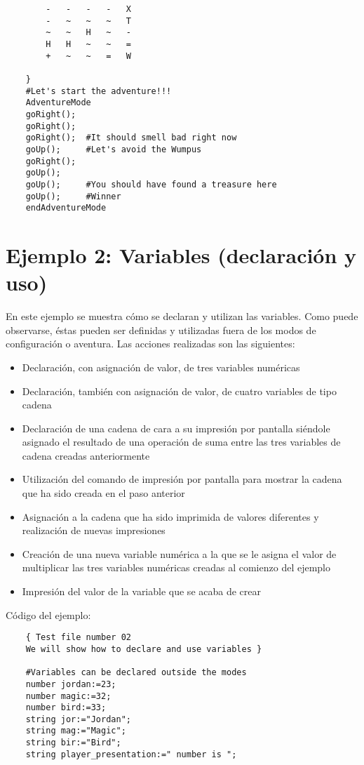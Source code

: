 \documentclass[a4paper,12pt,twoside,openright]{report}
\begin{document}
{\begin{lstlisting}
	    -	-	-	-	X
	    -	~	~	~	T
	    ~	~	H	~	-
	    H	H	~	~	=
	    +	~	~	=	W

    }
    #Let's start the adventure!!!
    AdventureMode
    goRight();
    goRight();
    goRight();	#It should smell bad right now
    goUp();		#Let's avoid the Wumpus
    goRight();
    goUp();
    goUp();		#You should have found a treasure here
    goUp();		#Winner
    endAdventureMode
  \end{lstlisting}

  
  \section{Ejemplo 2: Variables (declaración y uso)}
  En este ejemplo se muestra cómo se declaran y utilizan las variables. Como puede observarse, éstas pueden ser 
  definidas y utilizadas fuera de los modos de configuración o aventura. Las acciones realizadas son las siguientes:
  \begin{itemize}
   \item Declaración, con asignación de valor, de tres variables numéricas
   \item Declaración, también con asignación de valor, de cuatro variables de tipo cadena
   \item Declaración de una cadena de cara a su impresión por pantalla siéndole asignado el resultado de una operación 
   de suma entre las tres variables de cadena creadas anteriormente
   \item Utilización del comando de impresión por pantalla para mostrar la cadena que ha sido creada en el paso anterior
   \item Asignación a la cadena que ha sido imprimida de valores diferentes y realización de nuevas impresiones
   \item Creación de una nueva variable numérica a la que se le asigna el valor de multiplicar las tres variables numéricas 
   creadas al comienzo del ejemplo
   \item Impresión del valor de la variable que se acaba de crear
  \end{itemize}

  Código del ejemplo:
  \begin{lstlisting}
    { Test file number 02
    We will show how to declare and use variables }

    #Variables can be declared outside the modes
    number jordan:=23;
    number magic:=32;
    number bird:=33;
    string jor:="Jordan";
    string mag:="Magic";
    string bir:="Bird";
    string player_presentation:=" number is ";



\end{lstlisting}}
\end{document}
